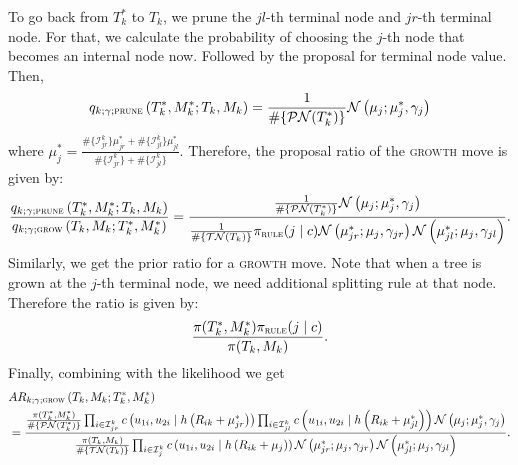 \documentclass[
12pt]{article}
\begin{document}
	To go back from $T^{\ast}_k$ to $T_k$, we prune the $jl$-th terminal node and $jr$-th terminal node. For that, we calculate the probability of choosing the $j$-th node that becomes an internal node now. Followed by the proposal for terminal node value. Then,
	\begin{equation*}
		q_{k;\gamma;\textsc{prune}}\left(T_k^{\ast}, M_k^{\ast};T_k,M_k\right) 
		= \frac{1}{\#\{\mathcal{PN}(T_k^{\ast})\}} \mathcal{N}\left(\mu_j;\mu^{\ast}_j,\gamma_j\right)
	\end{equation*} 
	where $\mu^{\ast}_j = \frac{ \#\{\mathcal{I}^k_{jr}\}\mu_{jr}^{\ast} +  \#\{\mathcal{I}^k_{jl}\}\mu_{jl}^{\ast}}{ \#\{\mathcal{I}^k_{jr}\}+ \#\{\mathcal{I}^k_{jl}\}}$. Therefore, the proposal ratio of the \textsc{growth} move is given by:
	\begin{equation*}
		\frac{q_{k;\gamma;\textsc{prune}}\left(T_k^{\ast}, M_k^{\ast};T_k,M_k\right)}{q_{k;\gamma;\textsc{grow}}\left(T_k,M_k;T_k^{\ast}, M_k^{\ast}\right) } 
		= \frac{\frac{1}{\#\{\mathcal{PN}(T_k^{\ast})\}} \mathcal{N}\left(\mu_j;\mu_{j}^{\ast},\gamma_j\right)}{\frac{1}{\#\{\mathcal{TN}(T_k)\}} \pi_{\textsc{rule}}(j\mid c)\mathcal{N}\left(\mu_{jr}^{\ast};\mu_{j},\gamma_{jr}\right)\mathcal{N}\left(\mu_{jl}^{\ast};\mu_{j},\gamma_{jl}\right)}.
	\end{equation*}
	Similarly, we get the prior ratio for a \textsc{growth} move. Note that when a tree is grown at the $j$-th terminal node, we need additional splitting rule at that node. Therefore the ratio is given by:
	\begin{equation*}
		\frac{\pi(T_k^{\ast},M_k^{\ast})\pi_{\textsc{rule}}(j\mid c)}{\pi(T_k,M_k)}.
	\end{equation*}
	Finally, combining with the likelihood we get
	\begin{align*}
		&AR_{k;\gamma;\textsc{grow}}\left(T_k,M_k;T_k^{\ast}, M_k^{\ast}\right)\\
		&= \frac{
			\frac{\pi(T_k^{\ast},M_k^{\ast})}{\#\{\mathcal{PN}(T_k^{\ast})\}} 
			\prod_{i\in \mathcal{I}_{jr}^k}c\left(u_{1i},u_{2i}\mid h\left(R_{ik}+\mu^{\ast}_{jr}\right)\right)
			\prod_{i\in \mathcal{I}_{jl}^k}c\left(u_{1i},u_{2i}\mid h\left(R_{ik}+\mu^{\ast}_{jl}\right)\right)
			\mathcal{N}\left(\mu_j;\mu_{j}^{\ast},\gamma_j\right)}
		{\frac{\pi(T_k,M_k)}{\#\{\mathcal{TN}(T_k)\}} 
			\prod_{i\in \mathcal{I}_{j}^k}c\left(u_{1i},u_{2i}\mid h\left(R_{ik}+\mu_j\right)\right) 
			\mathcal{N}\left(\mu_{jr}^{\ast};\mu_{j},\gamma_{jr}\right)\mathcal{N}\left(\mu_{jl}^{\ast};\mu_{j},\gamma_{jl}\right)}.
	\end{align*}
\end{document}
